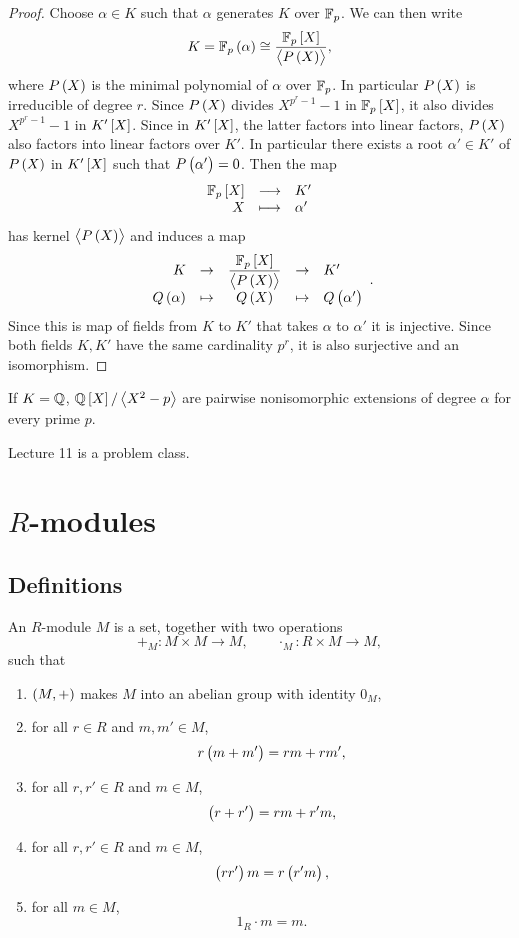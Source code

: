 \begin{proof}
Choose $ \alpha \in K $ such that $ \alpha $ generates $ K $ over $ \mathbb{F}_p $. We can then write
$$ K = \F_p\br{\alpha} \cong \dfrac{\F_p\sbr{X}}{\abr{P\br{X}}}, $$
where $ P\br{X} $ is the minimal polynomial of $ \alpha $ over $ \mathbb{F}_p $. In particular $ P\br{X} $ is irreducible of degree $ r $. Since $ P\br{X} $ divides $ X^{p^r - 1} - 1 $ in $ \F_p\sbr{X} $, it also divides $ X^{p^r - 1} - 1 $ in $ K'\sbr{X} $. Since in $ K'\sbr{X} $, the latter factors into linear factors, $ P\br{X} $ also factors into linear factors over $ K' $. In particular there exists a root $ \alpha' \in K' $ of $ P\br{X} $ in $ K'\sbr{X} $ such that $ P\br{\alpha'} = 0 $. Then the map
$$ \function{\F_p\sbr{X}}{K'}{X}{\alpha'} $$
has kernel $ \abr{P\br{X}} $ and induces a map
$$
\begin{array}{rcccl}
K & \to & \dfrac{\F_p\sbr{X}}{\abr{P\br{X}}} & \to & K' \\
Q\br{\alpha} & \mapsto & Q\br{X} & \mapsto & Q\br{\alpha'}
\end{array}.
$$
Since this is map of fields from $ K $ to $ K' $ that takes $ \alpha $ to $ \alpha' $ it is injective. Since both fields $ K, K' $ have the same cardinality $ p^r $, it is also surjective and an isomorphism.
\end{proof}

If $ K = \mathbb{Q} $, $ \Q\sbr{X} / \abr{X^2 - p} $ are pairwise nonisomorphic extensions of degree $ \alpha $ for every prime $ p $.


Lecture 11 is a problem class.

\pagebreak

\section{$ R $-modules}


\subsection{Definitions}

\begin{definition}
An $ R $-module $ M $ is a set, together with two operations
$$ +_M : M \times M \to M, \qquad \cdot_M : R \times M \to M, $$
such that
\begin{enumerate}
\item $ \br{M, +} $ makes $ M $ into an abelian group with identity $ 0_M $,
\item for all $ r \in R $ and $ m, m' \in M $,
$$ r\br{m + m'} = rm + rm', $$
\item for all $ r, r' \in R $ and $ m \in M $,
$$ \br{r + r'} = rm + r'm, $$
\item for all $ r, r' \in R $ and $ m \in M $,
$$ \br{rr'}m = r\br{r'm}, $$
\item for all $ m \in M $,
$$ 1_R \cdot m = m. $$
\end{enumerate}
\end{definition}

